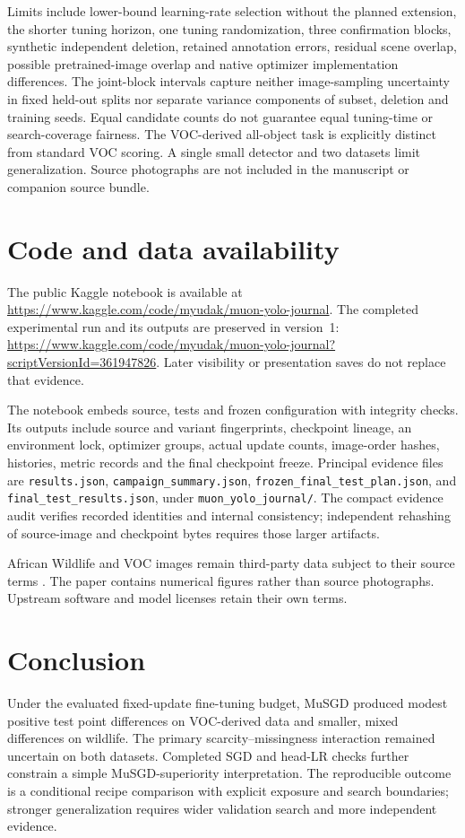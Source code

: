 \documentclass[11pt,a4paper]{article}
\begin{document}
Limits include lower-bound learning-rate selection without the planned extension, the shorter tuning horizon, one tuning randomization, three confirmation blocks, synthetic independent deletion, retained annotation errors, residual scene overlap, possible pretrained-image overlap and native optimizer implementation differences. The joint-block intervals capture neither image-sampling uncertainty in fixed held-out splits nor separate variance components of subset, deletion and training seeds. Equal candidate counts do not guarantee equal tuning-time or search-coverage fairness. The VOC-derived all-object task is explicitly distinct from standard VOC scoring. A single small detector and two datasets limit generalization. Source photographs are not included in the manuscript or companion source bundle.

\section{Code and data availability}
The public Kaggle notebook is available at
\url{https://www.kaggle.com/code/myudak/muon-yolo-journal}.
The completed experimental run and its outputs are preserved in version~1:
\url{https://www.kaggle.com/code/myudak/muon-yolo-journal?scriptVersionId=361947826}.
Later visibility or presentation saves do not replace that evidence.

The notebook embeds source, tests and frozen configuration with integrity checks. Its outputs include source and variant fingerprints, checkpoint lineage, an environment lock, optimizer groups, actual update counts, image-order hashes, histories, metric records and the final checkpoint freeze. Principal evidence files are \texttt{results.json}, \texttt{campaign\_summary.json}, \texttt{frozen\_final\_test\_plan.json}, and \texttt{final\_test\_results.json}, under \texttt{muon\_yolo\_journal/}. The compact evidence audit verifies recorded identities and internal consistency; independent rehashing of source-image and checkpoint bytes requires those larger artifacts.

African Wildlife and VOC images remain third-party data subject to their source terms \cite{wildlifeData,everingham2010}. The paper contains numerical figures rather than source photographs. Upstream software and model licenses retain their own terms.

\section{Conclusion}
Under the evaluated fixed-update fine-tuning budget, MuSGD produced modest positive test point differences on VOC-derived data and smaller, mixed differences on wildlife. The primary scarcity--missingness interaction remained uncertain on both datasets. Completed SGD and head-LR checks further constrain a simple MuSGD-superiority interpretation. The reproducible outcome is a conditional recipe comparison with explicit exposure and search boundaries; stronger generalization requires wider validation search and more independent evidence.
\end{document}
